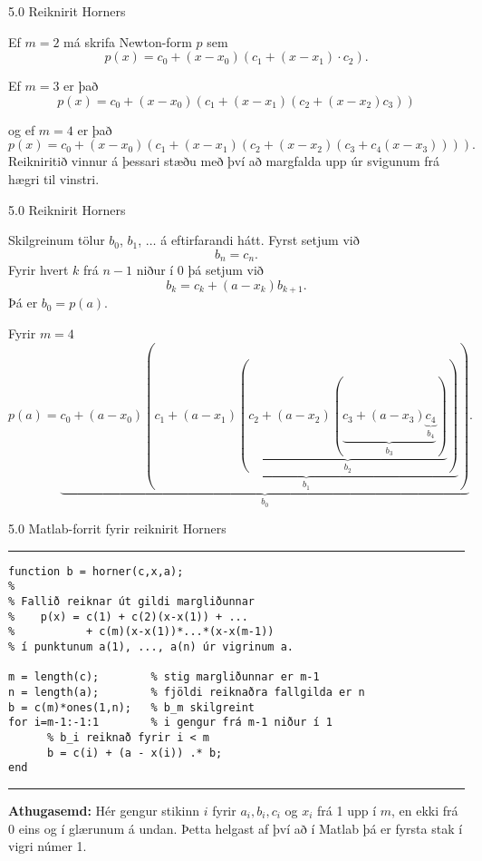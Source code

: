 \begin{frame}{5.0 Reiknirit Horners} 

Ef $m = 2$ má skrifa Newton-form $p$ sem
\begin{equation*}
	p(x) = c_0 + (x-x_0)(c_1 + (x-x_1) \cdot c_2).
\end{equation*}

\pause
Ef $m = 3$ er það
\begin{equation*}
	p(x) = c_0 + (x-x_0)(c_1 + (x-x_1)(c_2 + (x-x_2)c_3))
\end{equation*}

\pause
og ef $m = 4$ er það
\begin{equation*}
	p(x) = c_0 + (x-x_0)(c_1 + (x-x_1)(c_2 + (x-x_2)
	(c_3 + c_4(x-x_3)))).
\end{equation*}
Reikniritið vinnur á þessari stæðu með því að margfalda upp úr
svigunum frá hægri til vinstri. 
\end{frame}

\begin{frame}{5.0 Reiknirit Horners} 

Skilgreinum tölur $b_0$, $b_1$, $\ldots$ á eftirfarandi hátt.
Fyrst setjum við 
$$b_n = c_n.$$
Fyrir hvert $k$ frá $n-1$ niður í 0 þá setjum við
\[
	b_k = c_k + (a - x_k) b_{k+1}.
\]
\pause
Þá er $b_0 = p(a)$. 

\medskip
\pause

\begin{block}{Fyrir $m=4$}
 \begin{equation*}
	p(a) = 
	\underbrace{
	  c_0 + (a-x_0)(
	  \underbrace{
	    c_1 + (a-x_1)(
	      \underbrace{c_2 + (a-x_2)(
		\underbrace{c_3 + (a-x_3)
		  \underbrace{c_4}_{b_4}
	      }_{b_3})
	    }_{b_2})
	  }_{b_1})
	}_{b_0}.
\end{equation*}
\end{block}

\end{frame}

\begin{frame}[fragile]{5.0 Matlab-forrit fyrir reiknirit Horners} 
\hrule
\begin{verbatim}
function b = horner(c,x,a); 
%  
% Fallið reiknar út gildi margliðunnar 
%    p(x) = c(1) + c(2)(x-x(1)) + ... 
%           + c(m)(x-x(1))*...*(x-x(m-1)) 
% í punktunum a(1), ..., a(n) úr vigrinum a. 

m = length(c);        % stig margliðunnar er m-1  
n = length(a);        % fjöldi reiknaðra fallgilda er n
b = c(m)*ones(1,n);   % b_m skilgreint
for i=m-1:-1:1        % i gengur frá m-1 niður í 1
      % b_i reiknað fyrir i < m
      b = c(i) + (a - x(i)) .* b; 
end 
\end{verbatim}
\hrule

\pause
\textbf{Athugasemd:} Hér gengur stikinn $i$ fyrir $a_i, b_i, c_i$ og $x_i$ frá 1 upp í $m$, en
ekki frá 0 eins og í glærunum á undan. Þetta helgast af því að í Matlab þá er fyrsta stak í vigri 
númer 1. 
\end{frame}

